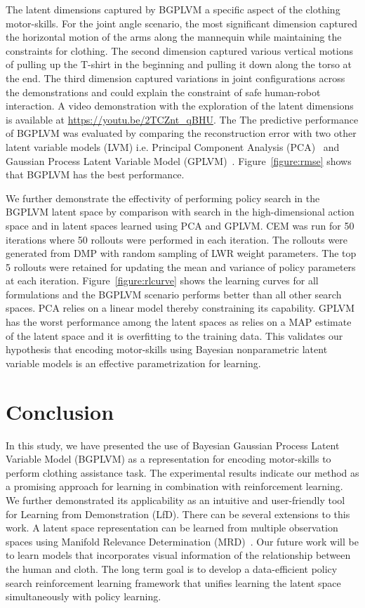 \documentclass{article}
\begin{document}
The latent dimensions captured by BGPLVM a specific aspect of the clothing motor-skills. For the joint angle scenario, the most significant dimension captured the horizontal motion of the arms along the mannequin while maintaining the constraints for clothing. The second dimension captured various vertical motions of pulling up the T-shirt in the beginning and pulling it down along the torso at the end. The third dimension captured variations in joint configurations across the demonstrations and could explain the constraint of safe human-robot interaction. A video demonstration with the exploration of the latent dimensions is available at \url{https://youtu.be/2TCZnt_qBHU}. The The predictive performance of BGPLVM was evaluated by comparing the reconstruction error with two other latent variable models (LVM) i.e. Principal Component Analysis (PCA)~\cite{pca} and Gaussian Process Latent Variable Model (GPLVM)~\cite{gplvm}. Figure~\ref{figure:rmse} shows that BGPLVM has the best performance.

We further demonstrate the effectivity of performing policy search in the BGPLVM latent space by comparison with search in the high-dimensional action space and in latent spaces learned using PCA and GPLVM. CEM was run for 50 iterations where 50 rollouts were performed in each iteration. The rollouts were generated from DMP with random sampling of LWR weight parameters. The top 5 rollouts were retained for updating the mean and variance of policy parameters at each iteration. Figure~\ref{figure:rlcurve} shows the learning curves for all formulations and the BGPLVM scenario performs better than all other search spaces. PCA relies on a linear model thereby constraining its capability. GPLVM has the worst performance among the latent spaces as relies on a MAP estimate of the latent space and it is overfitting to the training data. This validates our hypothesis that encoding motor-skills using Bayesian nonparametric latent variable models is an effective parametrization for learning.

\section{Conclusion}
\label{section:conclusion}

In this study, we have presented the use of Bayesian Gaussian Process Latent Variable Model (BGPLVM) as a representation for encoding motor-skills to perform clothing assistance task. The experimental results indicate our method as a promising approach for learning in combination with reinforcement learning. We further demonstrated its applicability as an intuitive and user-friendly tool for Learning from Demonstration (LfD). There can be several extensions to this work. A latent space representation can be learned from multiple observation spaces using Manifold Relevance Determination (MRD)~\cite{mrd}. Our future work will be to learn models that incorporates visual information of the relationship between the human and cloth. The long term goal is to develop a data-efficient policy search reinforcement learning framework that unifies learning the latent space simultaneously with policy learning.
\end{document}
